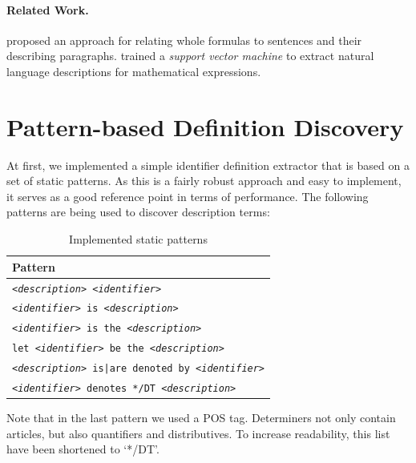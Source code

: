 \documentclass[runningheads]{llncs}
\begin{document}
\paragraph{Related Work.}

\citeauthor{Quoc2010} \cite{Quoc2010} proposed an approach for
relating whole formulas to sentences and their describing paragraphs.
\citeauthor{Yokoi} \cite{Yokoi} trained a \emph{support vector machine} to extract
natural language descriptions for mathematical expressions.

\section{Pattern-based Definition Discovery}

At first, we implemented a simple identifier definition extractor that is
based on a set of static patterns. As this is a fairly robust approach and easy
to implement, it serves as a good reference point in terms of
performance. The following patterns are being used to discover description
terms: 

\begin{table}
\vspace{-5pt}
	\begin{center}
		\begin{tabular}{| p{9.3cm} |}
			\hline
			Pattern \\
			\hline
			\texttt{\emph{<description>} \emph{<identifier>}} \\
			\texttt{\emph{<identifier>} is \emph{<description>}} \\
			\texttt{\emph{<identifier>} is the \emph{<description>}} \\
			\texttt{let \emph{<identifier>} be the \emph{<description>}} \\
			\texttt{\emph{<description>} is|are denoted by \emph{<identifier>}} \\
			\texttt{\emph{<identifier>} denotes */DT \emph{<description>}} \\
			\hline
		\end{tabular}
	\end{center}
\caption{Implemented static patterns}
\vspace{-5pt}
\end{table}

Note that in the last pattern we used a POS tag.  Determiners not only contain 
articles, but also quantifiers and distributives.
To increase readability, this list have been shortened to `*/DT'. 
\end{document}
